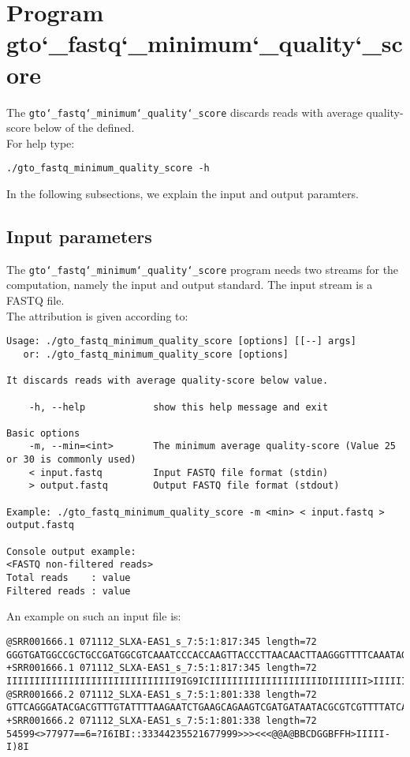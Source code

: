 \section{Program gto\char`_fastq\char`_minimum\char`_quality\char`_score}
The \texttt{gto\char`_fastq\char`_minimum\char`_quality\char`_score} discards reads with average quality-score below of the defined.\\
For help type:
\begin{lstlisting}
./gto_fastq_minimum_quality_score -h
\end{lstlisting}
In the following subsections, we explain the input and output paramters.

\subsection*{Input parameters}

The \texttt{gto\char`_fastq\char`_minimum\char`_quality\char`_score} program needs two streams for the computation,
namely the input and output standard. The input stream is a FASTQ file.\\
The attribution is given according to:
\begin{lstlisting}
Usage: ./gto_fastq_minimum_quality_score [options] [[--] args]
   or: ./gto_fastq_minimum_quality_score [options]

It discards reads with average quality-score below value.

    -h, --help            show this help message and exit

Basic options
    -m, --min=<int>       The minimum average quality-score (Value 25 or 30 is commonly used)
    < input.fastq         Input FASTQ file format (stdin)
    > output.fastq        Output FASTQ file format (stdout)

Example: ./gto_fastq_minimum_quality_score -m <min> < input.fastq > output.fastq

Console output example:
<FASTQ non-filtered reads>
Total reads    : value
Filtered reads : value
\end{lstlisting}
An example on such an input file is:
\begin{lstlisting}
@SRR001666.1 071112_SLXA-EAS1_s_7:5:1:817:345 length=72
GGGTGATGGCCGCTGCCGATGGCGTCAAATCCCACCAAGTTACCCTTAACAACTTAAGGGTTTTCAAATAGA
+SRR001666.1 071112_SLXA-EAS1_s_7:5:1:817:345 length=72
IIIIIIIIIIIIIIIIIIIIIIIIIIIIII9IG9ICIIIIIIIIIIIIIIIIIIIIDIIIIIII>IIIIII/
@SRR001666.2 071112_SLXA-EAS1_s_7:5:1:801:338 length=72
GTTCAGGGATACGACGTTTGTATTTTAAGAATCTGAAGCAGAAGTCGATGATAATACGCGTCGTTTTATCAT
+SRR001666.2 071112_SLXA-EAS1_s_7:5:1:801:338 length=72
54599<>77977==6=?I6IBI::33344235521677999>>><<<@@A@BBCDGGBFFH>IIIII-I)8I
\end{lstlisting}

